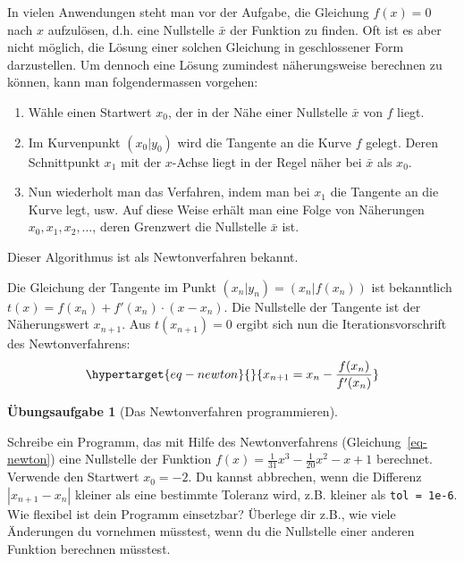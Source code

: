 \documentclass[
  letterpaper,
  DIV=11,
  oneside]{scrreprt}
\providecommand{\tightlist}{%
  \setlength{\itemsep}{0pt}\setlength{\parskip}{0pt}}\usepackage{longtable,booktabs,array}
\theoremstyle{definition}
\newtheorem{exercise}{Übungsaufgabe}[chapter]
\theoremstyle{definition}
\theoremstyle{remark}
\begin{document}
In vielen Anwendungen steht man vor der Aufgabe, die Gleichung
\(f(x) = 0\) nach \(x\) aufzulösen, d.h. eine Nullstelle \(\bar{x}\) der
Funktion zu finden. Oft ist es aber nicht möglich, die Lösung einer
solchen Gleichung in geschlossener Form darzustellen. Um dennoch eine
Lösung zumindest näherungsweise berechnen zu können, kann man
folgendermassen vorgehen:

\begin{enumerate}
\def\labelenumi{\arabic{enumi}.}
\tightlist
\item
  Wähle einen Startwert \(x_0\), der in der Nähe einer Nullstelle
  \(\bar{x}\) von \(f\) liegt.
\item
  Im Kurvenpunkt \((x_0 | y_0)\) wird die Tangente an die Kurve \(f\)
  gelegt. Deren Schnittpunkt \(x_1\) mit der \(x\)-Achse liegt in der
  Regel näher bei \(\bar{x}\) als \(x_0\).
\item
  Nun wiederholt man das Verfahren, indem man bei \(x_1\) die Tangente
  an die Kurve legt, usw. Auf diese Weise erhält man eine Folge von
  Näherungen \(x_0, x_1, x_2, \ldots\), deren Grenzwert die Nullstelle
  \(\bar{x}\) ist.
\end{enumerate}

Dieser Algorithmus ist als Newtonverfahren bekannt.

Die Gleichung der Tangente im Punkt \((x_n | y_n) = (x_n | f(x_n))\) ist
bekanntlich \(t(x) = f(x_n) + f'(x_n) \cdot (x - x_n)\). Die Nullstelle
der Tangente ist der Näherungswert \(x_{n+1}\). Aus \(t(x_{n+1}) = 0\)
ergibt sich nun die Iterationsvorschrift des Newtonverfahrens:
\begin{equation}\protect\hypertarget{eq-newton}{}{
x_{n+1} = x_n - \frac{f(x_n)}{f'(x_n)}
}\label{eq-newton}\end{equation}

\leavevmode{}%
\begin{exercise}[Das Newtonverfahren
programmieren]\label{exr-NewtonFirstTry}

Schreibe ein Programm, das mit Hilfe des Newtonverfahrens
(Gleichung~\ref{eq-newton}) eine Nullstelle der Funktion
\(f(x) = \frac{1}{31} x^3 -\frac{1}{20} x^2 -x + 1\) berechnet. Verwende
den Startwert \(x_0 = -2\). Du kannst abbrechen, wenn die Differenz
\(|x_{n+1} - x_n|\) kleiner als eine bestimmte Toleranz wird, z.B.
kleiner als \texttt{tol\ =\ 1e-6}. Wie flexibel ist dein Programm
einsetzbar? Überlege dir z.B., wie viele Änderungen du vornehmen
müsstest, wenn du die Nullstelle einer anderen Funktion berechnen
müsstest.

\end{exercise}
\end{document}
